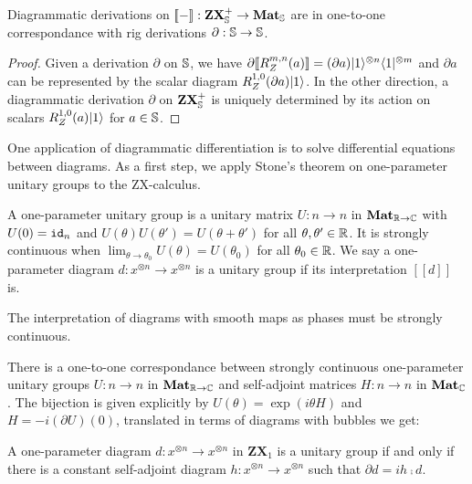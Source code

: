\begin{theorem}
Diagrammatic derivations on $[\![-]\!] : \mathbf{ZX}_\S^+ \to \mathbf{Mat}_\S$
are in one-to-one correspondance with rig derivations $\partial : \S \to \S$.
\end{theorem}

\begin{proof}
Given a derivation $\partial$ on $\S$, we have
$\partial [\![R_Z^{m, n}(a)]\!]
= (\partial a) \ket{1}^{\otimes n} \bra{1}^{\otimes m}$
and $\partial a$ can be represented by the scalar diagram
$R_Z^{1, 0}(\partial a) \ket{1}$.
In the other direction, a diagrammatic derivation $\partial$ on
$\mathbf{ZX}_\S^+$ is uniquely determined by its action on scalars
$R_Z^{1, 0}(a) \ket{1}$ for $a \in \S$.
\end{proof}

One application of diagrammatic differentiation is to solve
differential equations between diagrams. As a first step,
we apply Stone's theorem \cite{Stone32} on one-parameter unitary groups
to the ZX-calculus.

\begin{definition}
A one-parameter unitary group is a unitary matrix $U : n \to n$
in $\mathbf{Mat}_{\R \to \C}$ with $U(0) = \id_n$ and $U(\theta) U(\theta') = U(\theta + \theta')$
for all $\theta, \theta' \in \R$. It is strongly continuous when
$\lim_{\theta \to \theta_0} U(\theta) = U(\theta_0)$ for all $\theta_0 \in \R$.
We say a one-parameter diagram $d : x^{\otimes n} \to x^{\otimes n}$
is a unitary group if its interpretation $[\![d]\!]$ is.
\end{definition}

\begin{remark}
The interpretation of diagrams with smooth maps as phases must be strongly continuous.
\end{remark}

\begin{theorem}[Stone]
There is a one-to-one correspondance between strongly continuous one-parameter
unitary groups $U : n \to n$ in $\mathbf{Mat}_{\R \to \C}$ and self-adjoint
matrices $H : n \to n$ in $\mathbf{Mat}_{\C}$. The bijection is given
explicitly by $U(\theta) = \exp(i \theta H)$ and $H = - i (\partial U)(0)$,
translated in terms of diagrams with bubbles we get:
\end{theorem}

\begin{corollary}
A one-parameter diagram $d : x^{\otimes n} \to x^{\otimes n}$ in
$\mathbf{ZX}_1$ is a unitary group if and only if there is a constant
self-adjoint diagram
$h : x^{\otimes n} \to x^{\otimes n}$ such that $\partial d = i h \fcmp d$.
\end{corollary}

